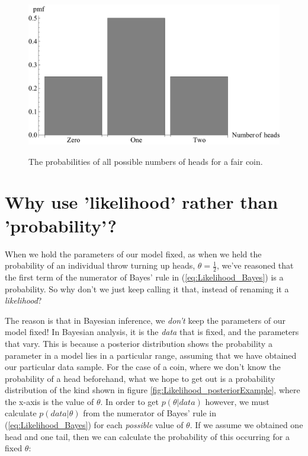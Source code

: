 \documentclass[11pt,fullpage]{book}
\begin{document}
\begin{figure}
\centering
\scalebox{0.5} 
{\includegraphics{Likelihood_fairCoin.pdf}}
\caption{The probabilities of all possible numbers of heads for a fair coin.}\label{fig:Likelihood_fairCoin}
\end{figure}

\section{Why use 'likelihood' rather than 'probability'?}
When we hold the parameters of our model fixed, as when we held the probability of an individual throw turning up heads, $\theta=\frac{1}{2}$, we've reasoned that the first term of the numerator of Bayes' rule in (\ref{eq:Likelihood_Bayes}) is a probability. So why don't we just keep calling it that, instead of renaming it a \textit{likelihood}? 

The reason is that in Bayesian inference, we \textit{don't} keep the parameters of our model fixed! In Bayesian analysis, it is the \textit{data} that is fixed, and the parameters that vary. This is because a posterior distribution shows the probability a parameter in a model lies in a particular range, assuming that we have obtained our particular data sample. For the case of a coin, where we don't know the probability of a head beforehand, what we hope to get out is a probability distribution of the kind shown in figure \ref{fig:Likelihood_posteriorExample}, where the x-axis is the value of $\theta$. In order to get $p(\theta|data)$ however, we must calculate $p(data|\theta)$ from the numerator of Bayes' rule in (\ref{eq:Likelihood_Bayes}) for each \textit{possible} value of $\theta$. If we assume we obtained one head and one tail, then we can calculate the probability of this occurring for a fixed $\theta$:
\end{document}
